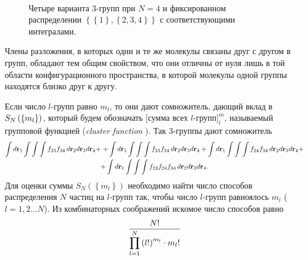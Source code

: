\begin{figure}[h]
\begin{minipage}{0.33\linewidth}
		\caption*{$\displaystyle \int d \mathbf{r}_1 \int \int \int f_{24} f_{34} \, d \mathbf{r}_2 d \mathbf{r}_3 d \mathbf{r}_4$}
	\end{minipage} \\
	\begin{center}
	\begin{minipage}{0.33\linewidth}
		\caption*{$\displaystyle \int d \mathbf{r}_1 \int \int \int f_{23} f_{24} f_{34} \, d \mathbf{r}_2 d \mathbf{r}_3 d \mathbf{r}_4$}
	\end{minipage}
\end{center}
\caption{Четыре варианта $3$-групп при $N = 4$ и фиксированном распределении $ \left\{ \left\{ 1 \right\}, \left\{ 2, 3, 4 \right\} \right\}$ с соответствующими интегралами.}
\end{figure}

Члены разложения, в которых одни и те же молекулы связаны друг с другом в групп, обладают тем общим свойством, что они отличны от нуля лишь в той области конфигурационного пространства, в которой молекулы одной группы находятся близко друг к другу.

Если число $l$-групп равно $m_l$, то они дают сомножитель, дающий вклад в $S_N \left( \left\{ m_l \right\} \right)$, который будем обозначать $\bigg[ \text{сумма всех $l$-групп} \bigg]^m_l$, называемый групповой функцией (\textit{cluster function} \cite{mayer}). Так 3-группы дают сомножитель
\vverh
\begin{gather}
\int d \mathbf{r}_1 \int \int \int f_{23} f_{34} \, d \mathbf{r}_2 d \mathbf{r}_3 d \mathbf{r}_4 + $ $+ \displaystyle \int d \mathbf{r}_1 \int \int \int f_{23} f_{24} \, d \mathbf{r}_2 d \mathbf{r}_3 d \mathbf{r}_4 + \int d \mathbf{r}_1 \int \int \int f_{24} f_{34} \, d \mathbf{r}_2 d \mathbf{r}_3 d \mathbf{r}_4 + \notag \\ + \int d \mathbf{r}_1 \int \int \int f_{23} f_{24} f_{34} \, d \mathbf{r}_2 d \mathbf{r}_3 d \mathbf{r}_4. \notag
\end{gather}
Для оценки суммы $S_N \left( \left\{ m_l \right\} \right)$ необходимо найти число способов распределения $N$ частиц на $l$-групп так, чтобы число $l$-групп равноялось $m_l$ ($l = 1, 2 \dots N$). Из комбинаторных соображений искомое число способов равно
\vverh
\begin{gather}
	\dfrac{N!}{\displaystyle\prod_{l=1}^{N} \left( l! \right)^{m_l} \cdot m_l !} \notag 
\end{gather}

